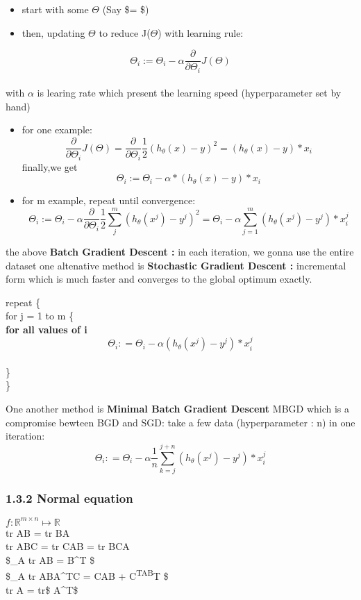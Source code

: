\documentclass[11pt]{article}
\providecommand{\tightlist}{%
      \setlength{\itemsep}{0pt}\setlength{\parskip}{0pt}}
\begin{document}
\begin{itemize}
\tightlist
\item
  start with some \(\Theta\) (Say \$\Theta =  \$)
\item
  then, updating \(\Theta\) to reduce J(\(\Theta\)) with learning rule:
\end{itemize}

\[\Theta_i := \Theta_i - \alpha \frac{\partial}{\partial \Theta_i} J(\Theta) \]\\
with \(\alpha\) is learing rate which present the learning speed
(hyperparameter set by hand)

\begin{itemize}
\item
  for one example:
  \[\frac{\partial}{\partial \Theta_i} J(\Theta) = \frac{\partial}{\partial \Theta_i} \frac{1}{2} (h_\theta(x) - y)^2 = (h_\theta(x) - y)* x_i\]
  finally,we get
  \[\Theta_i := \Theta_i - \alpha * (h_\theta(x) - y)* x_i \]
\item
  for m example, repeat until convergence:
  \[\Theta_i := \Theta_i - \alpha \frac{\partial}{\partial \Theta_i}\frac{1}{2} \sum_{j}^m (h_\theta(x^j) - y^j)^2 = \Theta_i - \alpha \sum_{j=1}^m (h_\theta(x^j) - y^j)*x_i^j \]
\end{itemize}

the above \textbf{Batch Gradient Descent :} in each iteration, we gonna
use the entire dataset one altenative method is \textbf{Stochastic
Gradient Descent :} incremental form which is much faster and converges
to the global optimum exactly.

repeat \{\\
for j = 1 to m \{\\
\textbf{for all values of i}
\[\Theta_i: = \Theta_i - \alpha (h_\theta(x^j) - y^j)*x_i^j \]\\
\}\\
\}

One another method is \textbf{Minimal Batch Gradient Descent} MBGD which
is a compromise bewteen BGD and SGD: take a few data (hyperparameter :
n) in one iteration:
\[\Theta_i: = \Theta_i - \alpha \frac{1}{n} \sum_{k=j}^{j+n}(h_\theta(x^j) - y^j)*x_i^j \]

\subsubsection{1.3.2 Normal equation}\label{normal-equation}

\(f : \mathbb{R}^{m\times n} \mapsto \mathbb{R}\)\\
tr AB = tr BA\\
tr ABC = tr CAB = tr BCA\\
\$\triangledown\_A tr AB = B\^{}T \$\\
\$\triangledown\_A tr ABA\^{}TC = CAB + C\textsuperscript{TAB}T \$\\
tr A = tr\$ A\^{}T\$
\end{document}
